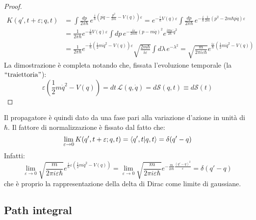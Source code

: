 \begin{proof}
	\begin{equation*}
		\begin{split}
			K(q',t+\varepsilon ; q,t)
			&= \int \frac{dp}{2\pi\hbar}\, e^{\frac{i}{\hbar} ( p\dot{q} - \frac{p^2}{2m} - V(q) ) \varepsilon} = e^{- \frac{i}{\hbar} V(q) \varepsilon} \int \frac{dp}{2\pi\hbar}\, e^{- \frac{i}{\hbar} \frac{1}{2m} (p^2 - 2m\hbar p\dot{q}) \varepsilon} \\
			&= \frac{1}{2\pi\hbar} e^{-\frac{i}{\hbar} V(q) \varepsilon} \int dp\, e^{-\frac{i \varepsilon}{2m\hbar} (p - m\dot{q})^2} e^{\frac{i m \varepsilon}{2\hbar} \dot{q}^2} \\
			&= \frac{1}{2\pi\hbar} e^{-\frac{i}{\hbar} (\frac{1}{2}m \dot{q}^2 - V(q)) \varepsilon} \sqrt{\frac{2m\hbar}{i\varepsilon}} \int d\lambda\, e^{-\lambda^2} = \sqrt{\frac{m}{2\pi i \varepsilon \hbar}} e^{\frac{i\varepsilon}{\hbar} (\frac{1}{2} m \dot{q}^2 - V(q))}
		\end{split}
	\end{equation*}
	La dimostrazione è completa notando che, fissata l'evoluzione temporale (la $ ``\text{traiettoria}" $):
	\begin{equation*}
		\varepsilon \left( \frac{1}{2} m \dot{q}^2 - V(q) \right) = dt\,\mathscr{L}(q,\dot{q}) = d\mathcal{S}(q,t) \equiv d\mathcal{S}(t)
	\end{equation*}
\end{proof}

Il propagatore è quindi dato da una fase pari alla variazione d'azione in unità di $ \hbar $. Il fattore di normalizzazione è fissato dal fatto che:
\begin{equation}
	\lim_{\varepsilon \rightarrow 0} K(q',t+\varepsilon ; q,t) = \braket{q',t | q,t} = \delta(q' - q)
	\label{eq:4.17}
\end{equation}
Infatti:
\begin{equation*}
	\lim_{\varepsilon \rightarrow 0} \sqrt{\frac{m}{2\pi i \varepsilon \hbar}} e^{\frac{i}{\hbar} \varepsilon ( \frac{1}{2} m \dot{q}^2 - V(q))} = \lim_{\varepsilon \rightarrow 0} \sqrt{\frac{m}{2\pi i \varepsilon \hbar}} e^{-\frac{m}{2i\hbar} \frac{(q' - q)^2}{\varepsilon}} = \delta(q' - q)
\end{equation*}
che è proprio la rappresentazione della delta di Dirac come limite di gaussiane.

\subsection{Path integral}

